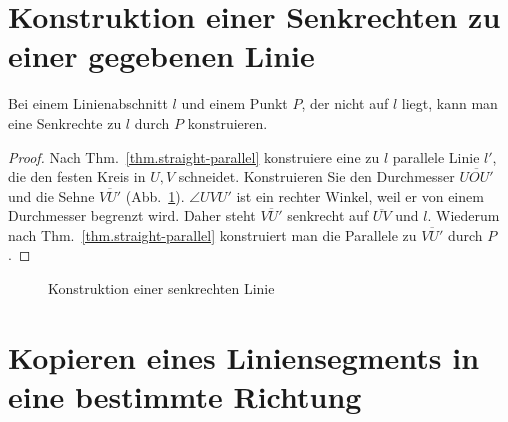 \section{Konstruktion einer Senkrechten zu einer gegebenen Linie}\label{s.perp}

\begin{theorem}\label{thm.straight-perp}
Bei einem Linienabschnitt $l$ und einem Punkt $P$, der nicht auf $l$ liegt, kann man eine Senkrechte zu $l$ durch $P$ konstruieren.
\end{theorem}

\begin{proof}
Nach Thm.~\ref{thm.straight-parallel} konstruiere eine zu $l$ parallele Linie $l'$, die den festen Kreis in $U,V$ schneidet. Konstruieren Sie den Durchmesser $\overline{UOU'}$ und die Sehne $\overline{VU'}$ (Abb.~\ref{f.se-perp}). $\angle UVU'$ ist ein rechter Winkel, weil er von einem Durchmesser begrenzt wird. Daher steht $\overline{VU'}$ senkrecht auf $\overline{UV}$ und $l$. Wiederum nach Thm.~\ref{thm.straight-parallel} konstruiert man die Parallele zu $\overline{VU'}$ durch $P$.
\end{proof}

\begin{figure}[ht]
\begin{center}
\end{center}
\caption{Konstruktion einer senkrechten Linie}\label{f.se-perp}
\end{figure}

\section{Kopieren eines Liniensegments in eine bestimmte Richtung}\label{s.copy}


